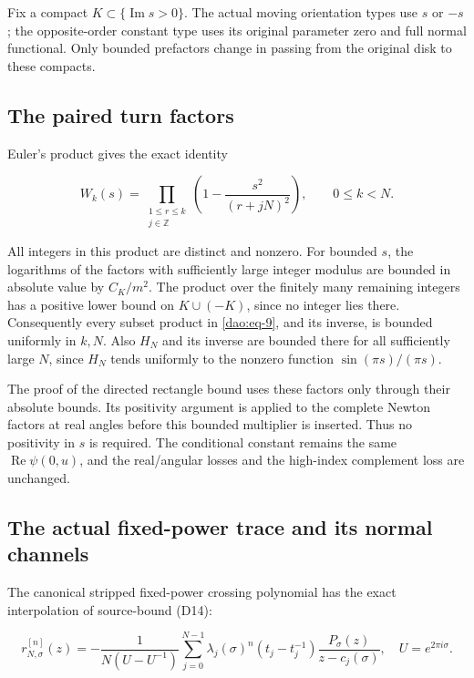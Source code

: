 Fix a compact \(K\subset\{\operatorname{Im}s>0\}\). The actual moving orientation types use \(s\) or \(-s\); the opposite-order constant type uses its original parameter zero and full normal functional. Only bounded prefactors change in passing from the original disk to these compacts.

\subsection{The paired turn factors}\label{dao:sec-3.1}

Euler's product gives the exact identity

\begin{equation}\label{dao:eq-9}
W_k(s)=\prod_{\substack{1\le r\le k\\j\in\mathbb Z}}
                  \left(1-\frac{s^2}{(r+jN)^2}\right),
                 \qquad 0\le k<N.
\end{equation}

All integers in this product are distinct and nonzero. For bounded \(s\), the logarithms of the factors with sufficiently large integer modulus are bounded in absolute value by \(C_K/m^2\). The product over the finitely many remaining integers has a positive lower bound on \(K\cup(-K)\), since no integer lies there. Consequently every subset product in \eqref{dao:eq-9}, and its inverse, is bounded uniformly in \(k,N\). Also \(H_N\) and its inverse are bounded there for all sufficiently large \(N\), since \(H_N\) tends uniformly to the nonzero function \(\sin(\pi s)/(\pi s)\).

The proof of the directed rectangle bound uses these factors only through their absolute bounds. Its positivity argument is applied to the complete Newton factors at real angles before this bounded multiplier is inserted. Thus no positivity in \(s\) is required. The conditional constant remains the same \(\operatorname{Re}\psi(0,u)\), and the real/angular losses and the high-index complement loss are unchanged.

\subsection{The actual fixed-power trace and its normal channels}\label{dao:sec-3.2}

The canonical stripped fixed-power crossing polynomial has the exact interpolation of source-bound (D14):

\begin{equation}\label{dao:eq-10}
r_{N,\sigma}^{[n]}(z)=
 -\frac1{N(U-U^{-1})}
 \sum_{j=0}^{N-1}\lambda_j(\sigma)^n(t_j-t_j^{-1})
                       \frac{P_\sigma(z)}{z-c_j(\sigma)},
 \quad U=e^{2\pi i\sigma}.
\end{equation}

